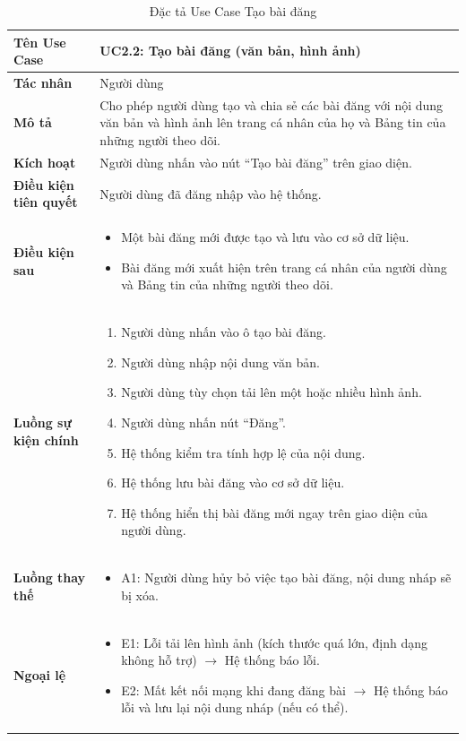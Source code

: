 \begin{table}[H]
\centering
\begin{tabularx}{\textwidth}{|l|X|}
\hline
\textbf{Tên Use Case} & \textbf{UC2.2: Tạo bài đăng (văn bản, hình ảnh)} \\ \hline
\textbf{Tác nhân} & Người dùng \\ \hline
\textbf{Mô tả} & Cho phép người dùng tạo và chia sẻ các bài đăng với nội dung văn bản và hình ảnh lên trang cá nhân của họ và Bảng tin của những người theo dõi. \\ \hline
\textbf{Kích hoạt} & Người dùng nhấn vào nút ``Tạo bài đăng'' trên giao diện. \\ \hline
\textbf{Điều kiện tiên quyết} & Người dùng đã đăng nhập vào hệ thống. \\ \hline
\textbf{Điều kiện sau} & 
\begin{itemize}
    \item Một bài đăng mới được tạo và lưu vào cơ sở dữ liệu.
    \item Bài đăng mới xuất hiện trên trang cá nhân của người dùng và Bảng tin của những người theo dõi.
\end{itemize} \\ \hline
\textbf{Luồng sự kiện chính} & 
\begin{enumerate}
    \item Người dùng nhấn vào ô tạo bài đăng.
    \item Người dùng nhập nội dung văn bản.
    \item Người dùng tùy chọn tải lên một hoặc nhiều hình ảnh.
    \item Người dùng nhấn nút ``Đăng''.
    \item Hệ thống kiểm tra tính hợp lệ của nội dung.
    \item Hệ thống lưu bài đăng vào cơ sở dữ liệu.
    \item Hệ thống hiển thị bài đăng mới ngay trên giao diện của người dùng.
\end{enumerate} \\ \hline
\textbf{Luồng thay thế} & 
\begin{itemize}
    \item A1: Người dùng hủy bỏ việc tạo bài đăng, nội dung nháp sẽ bị xóa.
\end{itemize} \\ \hline
\textbf{Ngoại lệ} & 
\begin{itemize}
    \item E1: Lỗi tải lên hình ảnh (kích thước quá lớn, định dạng không hỗ trợ) $\rightarrow$ Hệ thống báo lỗi.
    \item E2: Mất kết nối mạng khi đang đăng bài $\rightarrow$ Hệ thống báo lỗi và lưu lại nội dung nháp (nếu có thể).
\end{itemize} \\ \hline
\end{tabularx}
\caption{Đặc tả Use Case Tạo bài đăng}
\end{table}

